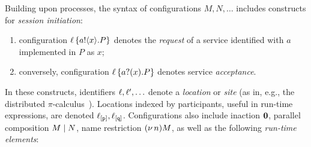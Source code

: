 \documentclass[runningheads]{llncs}
\begin{document}
Building upon processes, the syntax of configurations $M, N, \ldots$ includes constructs for \emph{session initiation}: 
\begin{enumerate}[$\bullet$]
\item configuration $\ell\left\{a ! \langle x \rangle .{P}\right\}$ denotes the \emph{request} of a service identified with $a$ implemented in 
$P$ as $x$; 
\item conversely, configuration 
$\ell\left\{a ? (x) .{P}\right\}$
denotes service \emph{acceptance}. 
\end{enumerate}
In these constructs,  identifiers $\ell, \ell', \ldots$ denote    a  \emph{location} 
or  \emph{site} (as in, e.g., the distributed $\pi$-calculus~\cite{Hennessy07}).
Locations indexed by participants, useful in run-time expressions, are denoted $\ell_{[\mathtt{p}]}, \ell_{[\mathtt{q}]}$.
Configurations also include
inaction $\mathbf{0}$, parallel composition  $M \;|\; N$,
name restriction $(\nu\, n) M$, as well as
 the following \emph{run-time elements}: %
 
\end{document}
